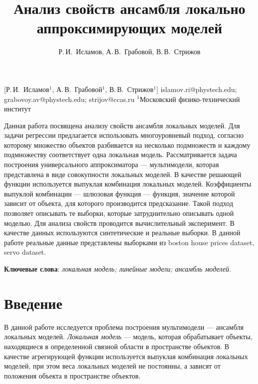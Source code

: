 \documentclass[12pt, twoside]{article}
\begin{document}
\title
    [Анализ свойств ансамбля локально аппроксимирующих моделей] %
    {Анализ свойств ансамбля локально аппроксимирующих моделей}
\author
    [Р.\,И.~Исламов] %
    {Р.\,И.~Исламов, А.\,В.~Грабовой, В.\,В.~Стрижов} %
    [Р.\,И.~Исламов$^1$, А.\,В.~Грабовой$^1$, В.\,В.~Стрижов$^{1}$] %
\email
    {islamov.ri@phystech.edu; grabovoy.av@phystech.edu;  strijov@ccas.ru}
\organization
    {$^1$Московский физико-технический институт}
\abstract
    {Данная работа посвящена анализу свойств ансамбля локальных моделей. Для задачи регрессии  предлагается использовать многоуровневый подход, согласно которому множество объектов разбивается на несколько подмножеств и каждому подмножеству соответствует одна локальная модель. Рассматривается задача построения универсального аппроксиматора --- мультимодели, которая представлена в виде совокупности локальных моделей. В качестве решающей функции используется выпуклая комбинация локальных моделей.  Коэффициенты выпуклой комбинации --- шлюзовая функция --- функция, значение которой зависит от объекта, для которого производится предсказание. Такой подход позволяет описывать те выборки, которые затруднительно описывать одной моделью. Для анализа свойств проводится вычислительный эксперимент. В качестве данных используются синтетические и реальные выборки. В данной работе реальные данные представлены выборками из boston house prices dataset, servo dataset.  
	
\bigskip
\noindent
\textbf{Ключевые слова}: \emph {локальная модель; линейные модели; ансамбль моделей.}
}

\maketitle
\linenumbers

\section{Введение}
В данной работе исследуется проблема построения мультимодели --- ансамбля локальных моделей. \textit{Локальная модель} --- модель, которая обрабатывает объекты, находящиеся в определенной связной области в пространстве объектов. В качестве агрегирующей функции используется выпуклая комбинация локальных моделей, при этом веса локальных моделей не постоянны, а зависят от положения объекта в пространстве объектов. 
\end{document}
